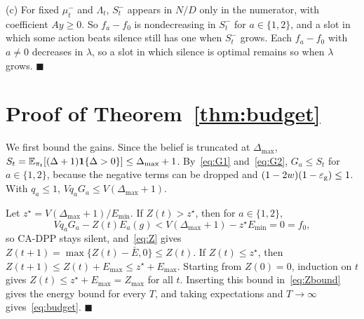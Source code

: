 (c) For fixed $\mu^-_t$ and $\Lambda_t$, $S^-_t$ appears in $N/D$ only in the numerator, with coefficient $Ay\ge0$. So $f_a-f_0$ is nondecreasing in $S^-_t$ for $a\in\{1,2\}$, and a slot in which some action beats silence still has one when $S^-_t$ grows. Each $f_a-f_0$ with $a\neq0$ decreases in $\lambda$, so a slot in which silence is optimal remains so when $\lambda$ grows. \hfill$\blacksquare$

\section{Proof of Theorem~\ref{thm:budget}}\label{app:budget}
We first bound the gains. Since the belief is truncated at $\Delta_{\max}$, $S_t=\mathbb{E}_{\pi_t}[(\Delta+1)\mathbf{1}\{\Delta>0\}]\le\Delta_{\max}+1$. By~\eqref{eq:G1} and~\eqref{eq:G2}, $G_a\le S_t$ for $a\in\{1,2\}$, because the negative terms can be dropped and $(1-2w)(1-\varepsilon_{\rm g})\le1$. With $q_a\le1$, $Vq_aG_a\le V(\Delta_{\max}+1)$.

Let $z^\star=V(\Delta_{\max}+1)/E_{\min}$. If $Z(t)>z^\star$, then for $a\in\{1,2\}$,
\[
Vq_aG_a-Z(t)E_a(g)<V(\Delta_{\max}+1)-z^\star E_{\min}=0=f_0,
\]
so CA-DPP stays silent, and~\eqref{eq:Z} gives $Z(t+1)=\max\{Z(t)-\bar E,0\}\le Z(t)$. If $Z(t)\le z^\star$, then $Z(t+1)\le Z(t)+E_{\max}\le z^\star+E_{\max}$. Starting from $Z(0)=0$, induction on $t$ gives $Z(t)\le z^\star+E_{\max}=Z_{\max}$ for all $t$. Inserting this bound in~\eqref{eq:Zbound} gives the energy bound for every $T$, and taking expectations and $T\to\infty$ gives~\eqref{eq:budget}. \hfill$\blacksquare$
